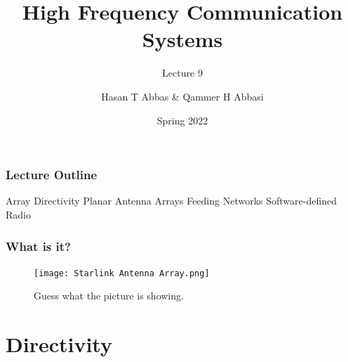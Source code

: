 \documentclass[10pt]{beamer}
\title{High Frequency Communication Systems}
\subtitle{Lecture 9}
\date{Spring 2022}
\author{Hasan T Abbas \& Qammer H Abbasi}
\begin{document}
\maketitle

\begin{frame}[fragile]
    \frametitle{Lecture Outline}
    \begin{outline}[itemize]
        \1 Array Directivity
        \1 Planar Antenna Arrays
        \1 Feeding Networks
        \1 Software-defined Radio 
    \end{outline}
\end{frame}
\begin{frame}
    \frametitle{What is it?}
    \begin{figure}[h!]
        \centering
        \texttt{[image: Starlink Antenna Array.png]}
        \caption{Guess what the picture is showing.}
        \label{Starlink}
    \end{figure}
    

\end{frame}


\section{Directivity}
\end{document}

